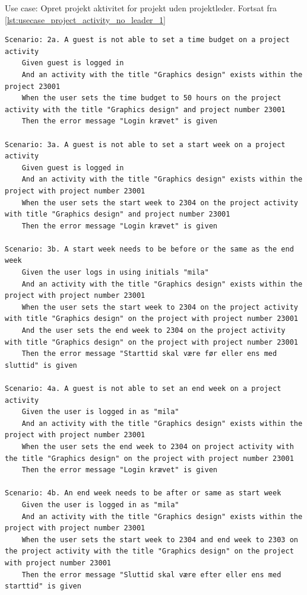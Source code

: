 \begin{listing}
    \centering
    \caption{Use case: Opret projekt aktivitet for projekt uden projektleder. Fortsat fra \cref{lst:usecase_project_activity_no_leader_1}}\label{lst:usecase_project_activity_no_leader_2}
    \begin{verbatim}
Scenario: 2a. A guest is not able to set a time budget on a project activity
    Given guest is logged in
    And an activity with the title "Graphics design" exists within the project 23001
    When the user sets the time budget to 50 hours on the project activity with the title "Graphics design" and project number 23001
    Then the error message "Login krævet" is given

Scenario: 3a. A guest is not able to set a start week on a project activity
    Given guest is logged in
    And an activity with the title "Graphics design" exists within the project with project number 23001
    When the user sets the start week to 2304 on the project activity with title "Graphics design" and project number 23001
    Then the error message "Login krævet" is given

Scenario: 3b. A start week needs to be before or the same as the end week
    Given the user logs in using initials "mila"
    And an activity with the title "Graphics design" exists within the project with project number 23001
    When the user sets the start week to 2304 on the project activity with title "Graphics design" on the project with project number 23001
    And the user sets the end week to 2304 on the project activity with title "Graphics design" on the project with project number 23001
    Then the error message "Starttid skal være før eller ens med sluttid" is given

Scenario: 4a. A guest is not able to set an end week on a project activity
    Given the user is logged in as "mila"
    And an activity with the title "Graphics design" exists within the project with project number 23001
    When the user sets the end week to 2304 on project activity with the title "Graphics design" on the project with project number 23001
    Then the error message "Login krævet" is given

Scenario: 4b. An end week needs to be after or same as start week
    Given the user is logged in as "mila"
    And an activity with the title "Graphics design" exists within the project with project number 23001
    When the user sets the start week to 2304 and end week to 2303 on the project activity with the title "Graphics design" on the project with project number 23001
    Then the error message "Sluttid skal være efter eller ens med starttid" is given
    \end{verbatim}
\end{listing}\clearpage
